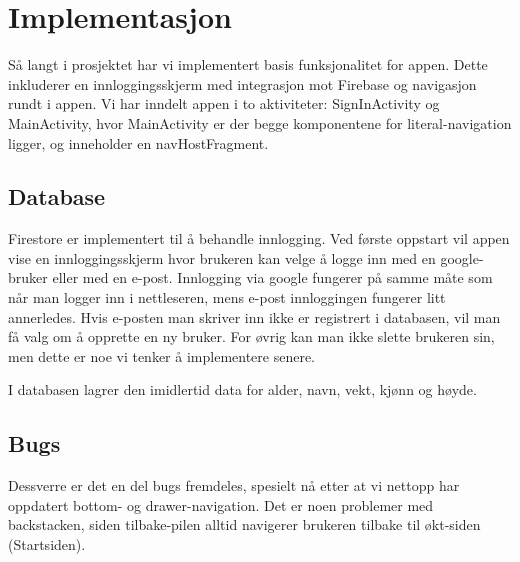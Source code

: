 \section{Implementasjon}

Så langt i prosjektet har vi implementert basis funksjonalitet for appen. Dette inkluderer en innloggingsskjerm med integrasjon mot Firebase og navigasjon rundt i appen. Vi har inndelt appen i to aktiviteter: SignInActivity og MainActivity, hvor MainActivity er der begge komponentene for literal-navigation ligger, og inneholder en navHostFragment. 

\subsection{Database}
Firestore er implementert til å behandle innlogging. Ved første oppstart vil appen vise en innloggingsskjerm hvor brukeren kan velge å logge inn med en google-bruker eller med en e-post. Innlogging via google fungerer på samme måte som når man logger inn i nettleseren, mens e-post innloggingen fungerer litt annerledes. Hvis e-posten man skriver inn ikke er registrert i databasen, vil man få valg om å opprette en ny bruker. For øvrig kan man ikke slette brukeren sin, men dette er noe vi tenker å implementere senere.

I databasen lagrer den imidlertid data for alder, navn, vekt, kjønn og høyde.

\subsection{Bugs}
Dessverre er det en del bugs fremdeles, spesielt nå etter at vi nettopp har oppdatert bottom- og drawer-navigation. Det er noen problemer med backstacken, siden tilbake-pilen alltid navigerer brukeren tilbake til økt-siden (Startsiden).
